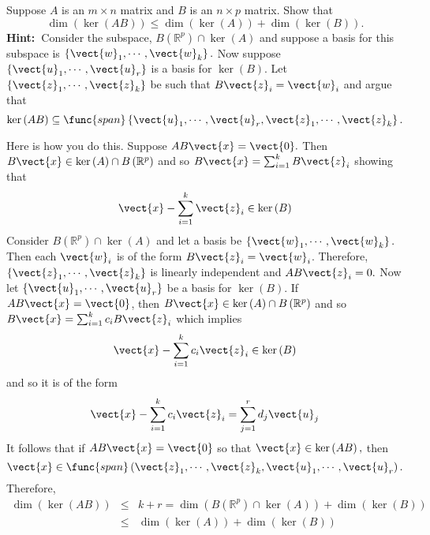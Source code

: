 \begin{enumialphparenastyle}
\begin{ex} Suppose $A$ is an $m\times n$ matrix and $B$ is an $n\times p$ matrix.
Show that 
\begin{equation*}
\dim \left( \ker \left( AB\right) \right) \leq \dim \left( \ker \left(
A\right) \right) +\dim \left( \ker \left( B\right) \right) .
\end{equation*}
\textbf{Hint:\ }Consider the subspace, $B\left( \mathbb{R}^{p}\right) \cap
\ker \left( A\right) $ and suppose a basis for this subspace is $\left\{ 
\vect{w}_{1},\cdots ,\vect{w}_{k}\right\} .$ Now suppose $\left\{ 
\vect{u}_{1},\cdots ,\vect{u}_{r}\right\} $ is a basis for $\ker \left(
B\right) .$ Let $\left\{ \vect{z}_{1},\cdots ,\vect{z}_{k}\right\} $ be
such that $B\vect{z}_{i}=\vect{w}_{i}$ and argue that 
\begin{equation*}
\ker \left( AB\right) \subseteq \func{span}\left\{ \vect{u}_{1},\cdots ,
\vect{u}_{r},\vect{z}_{1},\cdots ,\vect{z}_{k}\right\} .
\end{equation*}
\vspace{1mm}
\begin{sol}
Here is how you do this. Suppose $AB\vect{x}=\vect{0}.$ Then $B\vect{x}\in \ker
\left( A\right) \cap B\left( \mathbb{R}^{p}\right) $ and so $B\vect{x}
=\sum_{i=1}^{k}B\vect{z}_{i}$ showing that
\[
\vect{x}-\sum_{i=1}^{k}\vect{z}_{i}\in \ker \left( B\right) 
\]
Consider $B\left( \mathbb{R}^{p}\right) \cap \ker \left( A\right) $ and let
a basis be $\left\{ \vect{w}_{1},\cdots ,\vect{w}_{k}\right\} .$ Then
each $\vect{w}_{i}$ is of the form $B\vect{z}_{i}=\vect{w}_{i}$.
Therefore, $\left\{ \vect{z}_{1},\cdots ,\vect{z}_{k}\right\} $ is
linearly independent and $AB\vect{z}_{i}=0.$ Now let $\left\{ \vect{u}
_{1},\cdots ,\vect{u}_{r}\right\} $ be a basis for $\ker \left( B\right) .$
If $AB\vect{x}=\vect{0}$, then $B\vect{x} \in \ker \left( A\right) \cap B\left(
\mathbb{R}^{p}\right) $ and so $B\vect{x}=\sum_{i=1}^{k}c_{i}B\vect{z}
_{i}$ which implies
\[
\vect{x}-\sum_{i=1}^{k}c_{i}\vect{z}_{i}\in \ker \left( B\right)
\]
and so it is of the form
\[
\vect{x}-\sum_{i=1}^{k}c_{i}\vect{z}_{i}=\sum_{j=1}^{r}d_{j}\vect{u}
_{j}
\]
It follows that if $AB\vect{x}=\vect{0}$ so that $\vect{x}\in \ker \left(
AB\right) ,$ then
\[
\vect{x}\in \func{span}\left( \vect{z}_{1},\cdots ,\vect{z}_{k},
\vect{u}_{1},\cdots ,\vect{u}_{r}\right) .
\]
Therefore,
\begin{eqnarray*}
\dim \left( \ker \left( AB\right) \right)  &\leq &k+r=\dim \left( B\left(
\mathbb{R}^{p}\right) \cap \ker \left( A\right) \right) +\dim \left( \ker
\left( B\right) \right)  \\
&\leq &\dim \left( \ker \left( A\right) \right) +\dim \left( \ker \left(
B\right) \right)
\end{eqnarray*}
\end{sol}
\end{ex}



\end{enumialphparenastyle}
